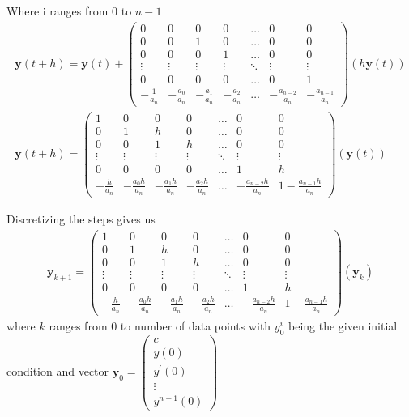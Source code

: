 \documentclass{beamer}
\providecommand{\brak}[1]{\ensuremath{\left(#1\right)}}
\theoremstyle{remark}
\newcommand{\myvec}[1]{\ensuremath{\begin{pmatrix}#1\end{pmatrix}}}
\let\vec\mathbf
\numberwithin{equation}{section}
\begin{document}
\begin{frame}
Where i ranges from 0 to $n-1$\\
\begin{align}
	\vec{y}\brak{t+h} = \vec{y}\brak{t} + \myvec{0 & 0 & 0 & 0 & \dots & 0 & 0\\ 0 & 0 & 1 & 0 & \dots & 0 & 0\\0 & 0 & 0 & 1 & \dots & 0 & 0\\\vdots & \vdots & \vdots & \vdots& \ddots & \vdots & \vdots\\
	0 & 0 & 0 & 0 & \dots & 0 & 1\\-\frac{1}{a_n} & -\frac{a_0}{a_n} & -\frac{a_1}{a_n} & -\frac{a_2}{a_n} & \dots & -\frac{a_{n-2}}{a_n} & -\frac{a_{n-1}}{a_n}}\brak{h\vec{y}\brak{t}}\\
	\vec{y}\brak{t+h} = \myvec{1 & 0 & 0 & 0 & \dots & 0 & 0\\ 0 & 1 & h & 0 & \dots & 0 & 0\\0 & 0 & 1 & h & \dots & 0 & 0\\\vdots & \vdots & \vdots & \vdots& \ddots & \vdots & \vdots\\
	0 & 0 & 0 & 0 & \dots & 1 & h\\-\frac{h}{a_n} & -\frac{a_0h}{a_n} & -\frac{a_1h}{a_n} & -\frac{a_2h}{a_n} & \dots & -\frac{a_{n-2}h}{a_n} & 1-\frac{a_{n-1}h}{a_n}}\brak{\vec{y}\brak{t}}
\end{align}
\end{frame}
\begin{frame}
Discretizing the steps gives us
\begin{align}
	\vec{y}_{k+1} = \myvec{1 & 0 & 0 & 0 & \dots & 0 & 0\\ 0 & 1 & h & 0 & \dots & 0 & 0\\0 & 0 & 1 & h & \dots & 0 & 0\\\vdots & \vdots & \vdots & \vdots& \ddots & \vdots & \vdots\\
	0 & 0 & 0 & 0 & \dots & 1 & h\\-\frac{h}{a_n} & -\frac{a_0h}{a_n} & -\frac{a_1h}{a_n} & -\frac{a_2h}{a_n} & \dots & -\frac{a_{n-2}h}{a_n} & 1-\frac{a_{n-1}h}{a_n}}\brak{\vec{y}_{k}}
\end{align}
where $k$ ranges from 0 to number of data points with $y^{i}_0$ being the given initial condition and vector $\vec{y}_0 = \myvec{c\\y\brak{0}\\y^\prime\brak{0}\\\vdots\\y^{n-1}\brak{0}}$
\end{frame}
\end{document}
